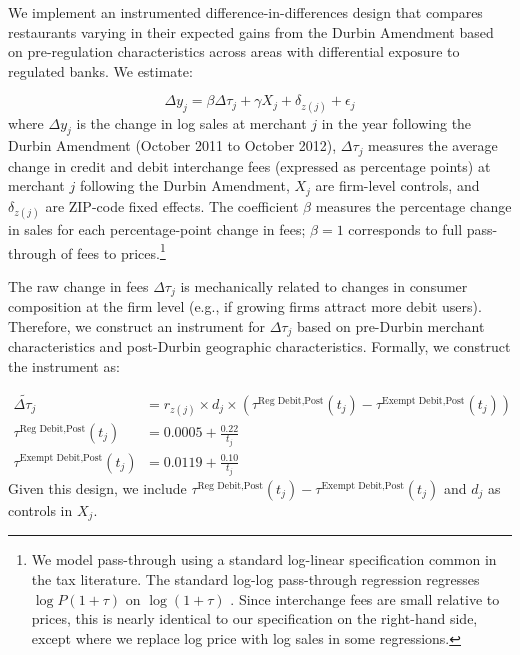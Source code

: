 \documentclass[main.tex]{subfiles}
\begin{document}
We implement an instrumented difference-in-differences design that compares restaurants varying in their expected gains from the Durbin Amendment based on pre-regulation characteristics across areas with differential exposure to regulated banks.
We estimate:

\begin{equation}
\Delta y_{j}=\beta\Delta\tau_{j} + \gamma X_j + \delta_{z(j)} + \epsilon_{j}\label{eq:durbin}
\end{equation}
where $\Delta y_{j}$ is the change in log sales at merchant $j$ in the year following the Durbin Amendment (October 2011 to October 2012), $\Delta\tau_{j}$ measures the average change in credit and debit interchange fees (expressed as percentage points) at merchant $j$ following the Durbin Amendment, $X_j$ are firm-level controls, and $\delta_{z(j)}$ are ZIP-code fixed effects.
The coefficient $\beta$ measures the percentage change in sales for each percentage-point change in fees; $\beta = 1$ corresponds to full pass-through of fees to prices.\footnote{ We model pass-through using a standard log-linear specification common in the tax literature.
The standard log-log pass-through regression regresses $\log P\left(1+\tau\right)$ on $\log\left(1+\tau\right)$ \citep{Butters.etal2022}.
Since interchange fees are small relative to prices, this is nearly identical to our specification on the right-hand side, except where we replace log price with log sales in some regressions. }

The raw change in fees $\Delta \tau_j$ is mechanically related to changes in consumer composition at the firm level (e.g., if growing firms attract more debit users).
Therefore, we construct an instrument for $\Delta \tau_j$ based on pre-Durbin merchant characteristics and post-Durbin geographic characteristics.
Formally, we construct the instrument as:

\begin{align}\widetilde{\Delta\tau_{j}} & = r_{z(j)}\times d_{j}\times\left(\tau^{\text{Reg Debit,Post}}(t_{j})-\tau^{\text{Exempt Debit,Post}}(t_{j})\right) \\
    \tau^{\text{Reg Debit,Post}}(t_{j}) & = 0.0005 + \frac{0.22}{t_j} \\
    \tau^{\text{Exempt Debit,Post}}(t_{j}) & = 0.0119 + \frac{0.10}{t_j}
\end{align}
Given this design, we include $\tau^{\text{Reg Debit,Post}}(t_{j}) - \tau^{\text{Exempt Debit,Post}}(t_{j})$ and $d_j$ as controls in $X_j$.
\end{document}
